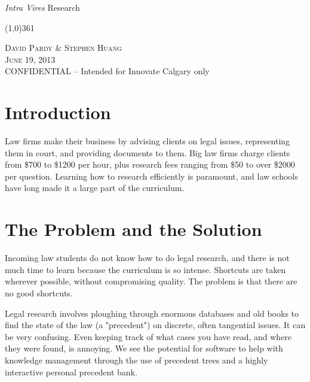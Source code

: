 \documentclass[11pt]{article}
\begin{document}
\setlength{\parindent}{1cm}

\frenchspacing

\begin{center}
\Huge
\emph{Intra Vires} Research
\end{center}
 \normalsize

\begin{center}
\vspace{-0.5in}
\line(1,0){361}


\normalsize
\textsc{David Pardy \& Stephen Huang}\\
\textsc{June 19, 2013}\\
CONFIDENTIAL -- Intended for Innovate Calgary only
\end{center}

\section*{Introduction}


Law firms make their business by advising clients on legal issues, representing them in court, and providing documents to them.  Big law firms charge clients from \$700 to \$1200 per hour, plus research fees ranging from \$50 to over \$2000 per question. Learning how to research efficiently is paramount, and law schools have long made it a large part of the curriculum.




\section*{The Problem and the Solution}

Incoming law students do not know how to do legal research, and there is not much time to learn because the curriculum is so intense. Shortcuts are taken wherever possible, without compromising quality. The problem is that there are no good shortcuts.

Legal research involves ploughing through enormous databases and old books to find the state of the law (a "precedent") on discrete, often tangential issues. It can be very confusing. Even keeping track of what cases you have read, and where they were found, is annoying. We see the potential for software to help with knowledge management through the use of precedent trees and a highly interactive personal precedent bank. 
\end{document}
